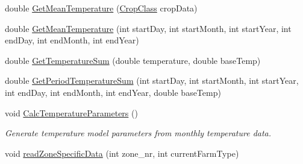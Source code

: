 \begin{DoxyCompactItemize}
double \mbox{\hyperlink{struct_global_vars_1_1zone_specific_data_a8d52babdca2e3209f22a58ed7d1824ba}{Get\+Mean\+Temperature}} (\mbox{\hyperlink{class_crop_class}{Crop\+Class}} crop\+Data)
\item 
double \mbox{\hyperlink{struct_global_vars_1_1zone_specific_data_a0b81c224c1cb9191f21487f0b1c45fd0}{Get\+Mean\+Temperature}} (int start\+Day, int start\+Month, int start\+Year, int end\+Day, int end\+Month, int end\+Year)
\item 
double \mbox{\hyperlink{struct_global_vars_1_1zone_specific_data_a3a76a8cc114ee80915101d99b64188b2}{Get\+Temperature\+Sum}} (double temperature, double base\+Temp)
\item 
double \mbox{\hyperlink{struct_global_vars_1_1zone_specific_data_ac2781331f31682c03135f853166c18f5}{Get\+Period\+Temperature\+Sum}} (int start\+Day, int start\+Month, int start\+Year, int end\+Day, int end\+Month, int end\+Year, double base\+Temp)
\item 
void \mbox{\hyperlink{struct_global_vars_1_1zone_specific_data_a8ab3efd8e62fee5861270aae9d599a28}{Calc\+Temperature\+Parameters}} ()
\begin{DoxyCompactList}\small\item\em Generate temperature model parameters from monthly temperature data. \end{DoxyCompactList}\item 
void \mbox{\hyperlink{struct_global_vars_1_1zone_specific_data_a8abd745cc132dff95df9a4f982f1071c}{read\+Zone\+Specific\+Data}} (int zone\+\_\+nr, int current\+Farm\+Type)
\end{DoxyCompactItemize}
